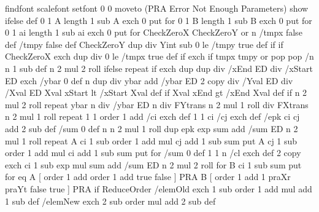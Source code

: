 {{{         }{ \psk@PSfont\space findfont \psk@fontscale\space scalefont setfont
         0 0 moveto (PRA Error Not Enough Parameters) show } ifelse } def
  0 1 A length 1 sub { A exch 0 put } for
  0 1 B length 1 sub { B exch 0 put } for
  0 1 ai length 1 sub { ai exch 0 put } for
  CheckZeroX CheckZeroY or {
  n { /tmpx false def /tmpy false def
    CheckZeroY { dup \pst@number\psyunit\space div Yint sub 0 le { /tmpy true def  } if } if  
    CheckZeroX { exch dup \pst@number\psxunit\space div 0 le { /tmpx true def } if exch } if
    tmpx tmpy or { pop pop /n n 1 sub def }{ n 2 mul 2 roll } ifelse
    } repeat } if
  exch dup dup
  \pst@number\psxunit\space div /xEnd ED
  \pst@number\psxunit\space div /xStart ED    
  exch
  /ybar 0 def
  n {                         %
    dup \pst@number\psyunit\space div ybar add /ybar ED
    2 copy      %
    \pst@number\psyunit\space div /Yval ED
    \pst@number\psxunit\space div /Xval ED
    Xval xStart lt { /xStart Xval def } if    %
    Xval xEnd gt { /xEnd Xval def } if        %
    n 2 mul 2 roll    %
  } repeat
  ybar n div /ybar ED
  n {
    \pst@number\psyunit\space div FYtrans
    n 2 mul 1 roll
    \pst@number\psxunit\space div FXtrans
    n 2 mul 1 roll
  } repeat
  1 1 order 1 add { /ci exch def
    1 1 ci { /cj exch def
      /epk ci cj add 2 sub def
      /sum 0 def
      n { n 2 mul 1 roll
        dup epk exp sum add /sum ED
        n 2 mul 1 roll
      } repeat
      A
      ci 1 sub order 1 add mul cj add 1 sub
      sum put %
      A
      cj 1 sub order 1 add mul ci add 1 sub
      sum put %
    } for
    /sum 0 def
    1 1 n { /cl exch def
      2 copy
      exch
      ci 1 sub exp mul sum add /sum ED
      n 2 mul 2 roll
    } for
    B
    ci 1 sub
    sum put
  } for
  \Pst@Debug{} eq {
  A [ order 1 add order 1 add \psk@MaPos\space \psk@MaScale\space true false ] PRA
  B [ order 1 add 1 praXr praYt \psk@MaScale\space false true ] PRA
  } if
  ReduceOrder {
    /elemOld { exch 1 sub order 1 add mul add 1 sub } def
    /elemNew { exch 2 sub order mul add 2 sub  } def     
}}
